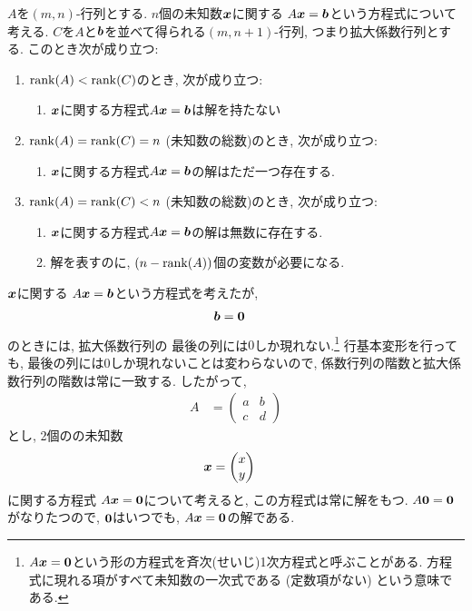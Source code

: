 \begin{theorem}
  \label{thm:solution:syslineq}
  $A$を$(m,n)$-行列とする.
  $n$個の未知数$\boldsymbol{x}$に関する
  $A\boldsymbol{x}=\boldsymbol{b}$という方程式について考える.
  $C$を$A$と$\boldsymbol{b}$を並べて得られる$(m,n+1)$-行列,
  つまり拡大係数行列とする.
  このとき次が成り立つ:
  \begin{enumerate}
  \item $\operatorname{rank}(A)<\operatorname{rank}(C)$のとき, 次が成り立つ:
    \begin{enumerate}
    \item $\boldsymbol{x}$に関する方程式$A\boldsymbol{x}=\boldsymbol{b}$は解を持たない
    \end{enumerate}
  \item $\operatorname{rank}(A)=\operatorname{rank}(C)=n$ (未知数の総数)のとき, 次が成り立つ:
    \begin{enumerate}
    \item $\boldsymbol{x}$に関する方程式$A\boldsymbol{x}=\boldsymbol{b}$の解はただ一つ存在する.
    \end{enumerate}
  \item $\operatorname{rank}(A)=\operatorname{rank}(C)<n$ (未知数の総数)のとき, 次が成り立つ:
    \begin{enumerate}
    \item $\boldsymbol{x}$に関する方程式$A\boldsymbol{x}=\boldsymbol{b}$の解は無数に存在する.
    \item 解を表すのに, $(n-\operatorname{rank}(A))$個の変数が必要になる.
    \end{enumerate}
  \end{enumerate}
\end{theorem}

$\boldsymbol{x}$に関する
$A\boldsymbol{x}=\boldsymbol{b}$という方程式を考えたが,
\begin{align*}
  \boldsymbol{b}&=\boldsymbol{0}
\end{align*}
のときには,
拡大係数行列の
最後の列には$0$しか現れない.\footnote{$A\boldsymbol{x}=\boldsymbol{0}$という形の方程式を斉次(せいじ)1次方程式と呼ぶことがある. 方程式に現れる項がすべて未知数の一次式である (定数項がない) という意味である.}
行基本変形を行っても, 
最後の列には$0$しか現れないことは変わらないので,
係数行列の階数と拡大係数行列の階数は常に一致する.
したがって, 
\begin{align*}
  A&=
  \begin{pmatrix}
    a&b\\
    c&d
  \end{pmatrix}
\end{align*}
とし, 2個のの未知数
\begin{align*}
  \boldsymbol{x}&=
  \begin{pmatrix}
    x\\y
  \end{pmatrix}
\end{align*}
に関する方程式 $A\boldsymbol{x}=\boldsymbol{0}$について考えると,
この方程式は常に解をもつ.
$A\boldsymbol{0}=\boldsymbol{0}$がなりたつので, $\boldsymbol{0}$はいつでも,
$A\boldsymbol{x}=\boldsymbol{0}$の解である.

